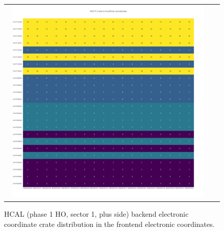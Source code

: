 \begin{figure}[htb]
 \begin{center}
  \begin{tabular}{cc}
   \includegraphics[angle=0,width=0.95\textwidth]{figures/appendix/HO1P_Crate_in_FrontEnd.png}
  \end{tabular}
  \caption{HCAL (phase 1 HO, sector 1, plus side) backend electronic coordinate crate distribution in the frontend electronic coordinates.}
  \label{fig:lmapHO1PCrateFEC}
 \end{center}
\end{figure}
\clearpage

